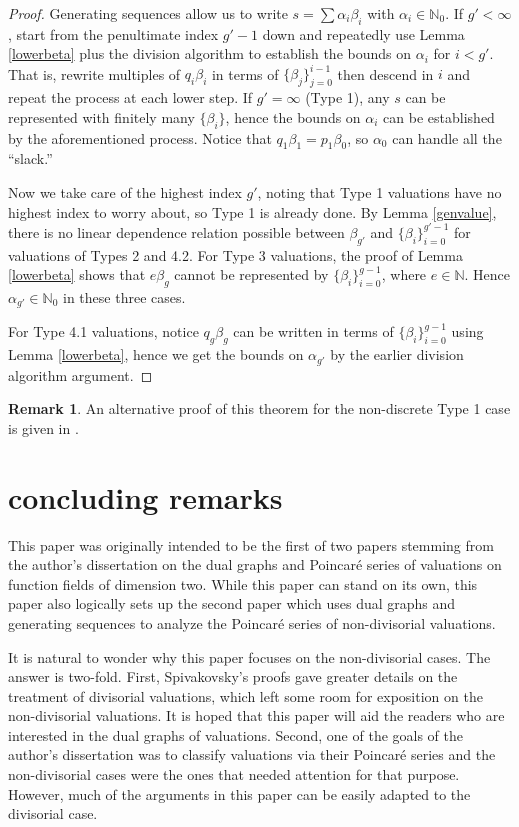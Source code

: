 \documentclass[11pt]{amsart}
\theoremstyle{definition}
\newtheorem*{rem}{Remark}
\begin{document}
{\begin{proof}
Generating sequences allow us to write $s=\sum \alpha_i \beta_i$ with $\alpha_i\in\mathbb{N}_0$. If $g'<\infty$, start from the penultimate index $g'-1$ down and repeatedly use Lemma \ref{lowerbeta} plus the division algorithm to establish the bounds on $\alpha_i$ for $i<g'$. That is, rewrite multiples of $q_i\beta_i$ in terms of $\displaystyle \{\beta_j\}_{j=0}^{i-1}$ then descend in $i$ and repeat the process at each lower step. If $g'=\infty$ (Type 1), any $s$ can be represented with finitely many $\{\beta_i\}$, hence the bounds on $\alpha_i$ can be established by the aforementioned process. Notice that $q_1\beta_1=p_1\beta_0$, so $\alpha_0$ can handle all the ``slack.''

Now we take care of the highest index $g'$, noting that Type 1 valuations have no highest index to worry about, so Type 1 is already done. By Lemma \ref{genvalue}, there is no linear dependence relation possible between $\beta_{g'}$ and $\{\beta_i\}_{i=0}^{g'-1}$ for valuations of Types 2 and 4.2. For Type 3 valuations, the proof of Lemma \ref{lowerbeta} shows that $e\beta_g$ cannot be represented by $\{\beta_i\}_{i=0}^{g-1}$, where $e\in\mathbb{N}$. Hence $\alpha_{g'}\in\mathbb{N}_0$ in these three cases.

For Type 4.1 valuations, notice $q_g\beta_g$ can be written in terms of $\displaystyle \{\beta_i\}_{i=0}^{g-1}$ using Lemma \ref{lowerbeta}, hence we get the bounds on $\alpha_{g'}$ by the earlier division algorithm argument.
\end{proof}

\begin{rem}
An alternative proof of this theorem for the non-discrete Type 1 case is given in \cite{ghk}.
\end{rem}


\section{concluding remarks} \label{sectcr}

This paper was originally intended to be the first of two papers stemming from the author's dissertation \cite{liphd} on the dual graphs and Poincar\'e series of valuations on function fields of dimension two. While this paper can stand on its own, this paper also logically sets up the second paper \cite{lisch} which uses dual graphs and generating sequences to analyze the Poincar\'e series of non-divisorial valuations.

It is natural to wonder why this paper focuses on the non-divisorial cases. The answer is two-fold. First, Spivakovsky's proofs gave greater details on the treatment of divisorial valuations, which left some room for exposition on the non-divisorial valuations. It is hoped that this paper will aid the readers who are interested in the dual graphs of valuations. Second, one of the goals of the author's dissertation was to classify valuations via their Poincar\'e series and the non-divisorial cases were the ones that needed attention for that purpose. However, much of the arguments in this paper can be easily adapted to the divisorial case.

}
\end{document}
